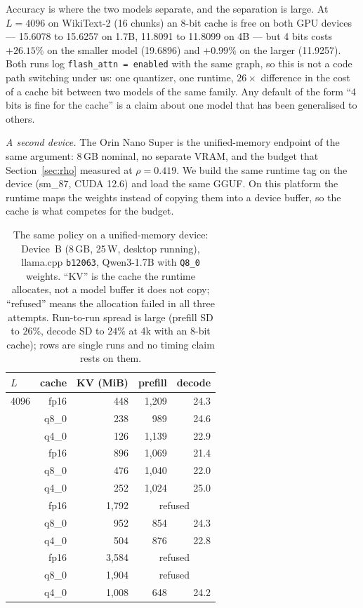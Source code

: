 \documentclass[10pt,journal]{IEEEtran}
\begin{document}
Accuracy is where the two models separate, and the separation is large. At
$L{=}4096$ on WikiText-2 (16 chunks) an 8-bit cache is free on both GPU devices --- 15.6078 to
15.6257 on 1.7B, 11.8091 to 11.8099 on 4B --- but 4 bits costs $+26.15\%$ on the
smaller model (19.6896) and $+0.99\%$ on the larger (11.9257). Both runs log
\texttt{flash\_attn = enabled} with the same graph, so this is not a code path
switching under us: one quantizer, one runtime, $26\times$ difference in the cost
of a cache bit between two models of the same family. Any default of the form
``4 bits is fine for the cache'' is a claim about one model that has been
generalised to others.

\emph{A second device.} The Orin Nano Super is the unified-memory endpoint of the
same argument: 8\,GB nominal, no separate VRAM, and the budget that
Section~\ref{sec:rho} measured at $\rho=0.419$. We build the same runtime tag on
the device (sm\_87, CUDA 12.6) and load the same GGUF. On this platform the runtime
maps the weights instead of copying them into a device buffer, so the cache is what
competes for the budget.

\begin{table}[t]
\caption{The same policy on a unified-memory device: Device~B
(8\,GB, 25\,W, desktop running), llama.cpp \texttt{b12063}, Qwen3-1.7B with \texttt{Q8\_0}
weights. ``KV'' is the cache the runtime allocates, not a model buffer it does not
copy; ``refused'' means the allocation failed in all three attempts. Run-to-run spread is large (prefill SD to $26\%$, decode SD to $24\%$ at 4k
with an 8-bit cache); rows are single runs and no timing claim rests on them.}
\label{tab:exec-orin}
\begin{tabular}{@{}lrrrr@{}}
\toprule
$L$ & cache & KV (MiB) & prefill & decode \\
\midrule
4096  & fp16  &   448 & 1{,}209 & 24.3 \\
      & q8\_0 &   238 &   989 & 24.6 \\
      & q4\_0 &   126 & 1{,}139 & 22.9 \\
\addlinespace
8192  & fp16  &   896 & 1{,}069 & 21.4 \\
      & q8\_0 &   476 & 1{,}040 & 22.0 \\
      & q4\_0 &   252 & 1{,}024 & 25.0 \\
\addlinespace
16384 & fp16  & 1{,}792 & \multicolumn{2}{c}{refused} \\
      & q8\_0 &   952 &   854 & 24.3 \\
      & q4\_0 &   504 &   876 & 22.8 \\
\addlinespace
32768 & fp16  & 3{,}584 & \multicolumn{2}{c}{refused} \\
      & q8\_0 & 1{,}904 & \multicolumn{2}{c}{refused} \\
      & q4\_0 & 1{,}008 &   648 & 24.2 \\
\bottomrule
\end{tabular}
\end{table}
\end{document}
